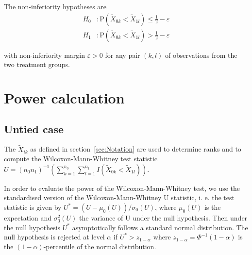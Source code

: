 \documentclass[bimj,fleqn]{w-art}\usepackage[]{graphicx}\usepackage[]{color}
\theoremstyle{plain}
\theoremstyle{definition}
\begin{document}
	The non-inferiority hypotheses are
  \begin{align*}
	H_0 &:  \text{P}(\widetilde{X}_{0k} < \widetilde{X}_{1l})
            \leq \frac{1}{2} - \varepsilon \\
  H_1 &:  \text{P}(\widetilde{X}_{0k} < \widetilde{X}_{1l})
            > \frac{1}{2} - \varepsilon
  \end{align*}

  with non-inferiority margin $\varepsilon > 0$ for any pair $(k, l)$ of
  observations from the two treatment groups.

  \section{Power calculation}
  \label{sec:Power}
  \subsection{Untied case}
  \label{sec:PowerUntied}
  The $\widetilde{X}_{ik}$ as defined in section~\ref{sec:Notation} are used to
	determine ranks and to compute the Wilcoxon-Mann-Whitney test statistic
	$ U =(n_0 n_1)^{-1}(\sum_{k=1}^{n_0}
	  \sum_{l=1}^{n_1}I(\widetilde{X}_{0k} < \widetilde{X}_{1l})) $.

	In order to evaluate the power of the Wilcoxon-Mann-Whitney test, we use the
  standardised version of the Wilcoxon-Mann-Whitney U statistic, i. e. the test
	statistic is given by $U^* =(U - \mu_0(U)) / \sigma_0(U)$, where $\mu_0(U)$ is the
	expectation and $\sigma^2_0(U)$ the variance of U under the null hypothesis.
	Then under the null hypothesis $U^*$ asymptotically follows a standard normal
	distribution. The null hypothesis is rejected at level $\alpha$ if
	$U^* > z_{1 - \alpha}$ where
  $z_{1-\alpha} = \Phi^{-1}({1-\alpha})$ is the $(1 - \alpha)$-percentile of the
  normal distribution.
\end{document}
